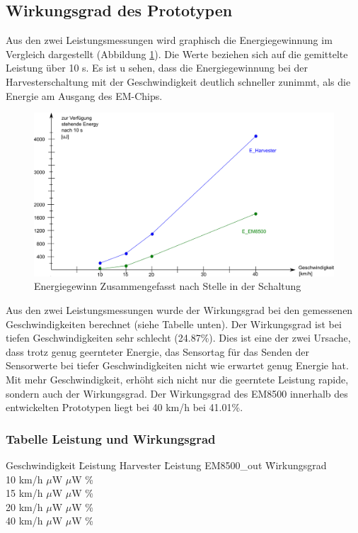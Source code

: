\subsection{Wirkungsgrad des Prototypen}

Aus den zwei Leistungsmessungen wird graphisch die Energiegewinnung im Vergleich dargestellt (Abbildung \ref{zsmEnergyGewinn}). Die Werte beziehen sich auf die gemittelte Leistung über 10 s. Es ist u sehen, dass die Energiegewinnung bei der Harvesterschaltung mit der Geschwindigkeit deutlich schneller zunimmt, als die Energie am Ausgang des EM-Chips. 

\begin{figure}[ht]
    \includegraphics[width=1\textwidth]{4Resultate/imag/EnergyGewinnNachStelle.png} 
    \caption{Energiegewinn Zusammengefasst nach Stelle in der Schaltung}
    \label{zsmEnergyGewinn}
\end{figure}

Aus den zwei Leistungsmessungen wurde der Wirkungsgrad bei den gemessenen Geschwindigkeiten berechnet (siehe Tabelle unten). Der Wirkungsgrad ist bei tiefen Geschwindigkeiten sehr schlecht (24.87\thinspace\%). Dies ist eine der zwei Ursache, dass trotz genug geernteter Energie, das Sensortag für das Senden der Sensorwerte bei tiefer Geschwindigkeiten nicht wie erwartet genug Energie hat. Mit mehr Geschwindigkeit, erhöht sich nicht nur die geerntete Leistung rapide, sondern auch der Wirkungsgrad. Der Wirkungsgrad des EM8500 innerhalb des entwickelten Prototypen liegt bei 40 km/h  bei 41.01\thinspace\%.  

\subsubsection*{Tabelle Leistung und Wirkungsgrad }
\begin{tabbing}
    Geschwindigkeit \quad\= Leistung Harvester \quad\= Leistung EM8500\_out \quad\= Wirkungsgrad\\[0.8ex]
    10 km/h    $\mu$W    $\mu$W \thinspace\%  \\
    15 km/h    $\mu$W   $\mu$W \thinspace\%  \\
    20 km/h  $\mu$W   $\mu$W \thinspace\%  \\
    40 km/h  $\mu$W  $\mu$W \thinspace\%  \\
\end{tabbing}   



